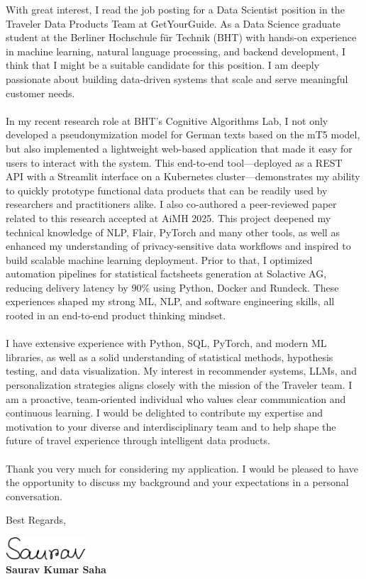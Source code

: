 \documentclass[10pt,a4paper,ragged2e,withhyper]{altacv}
\begin{document}
\begin{justify}

With great interest, I read the job posting for a Data Scientist position in 
the Traveler Data Products Team at GetYourGuide. As a Data Science graduate 
student at the Berliner Hochschule für Technik (BHT) with hands-on experience 
in machine learning, natural language processing, and backend development, I 
think that I might be a suitable candidate for this position. I am deeply 
passionate about building data-driven systems that scale and serve meaningful 
customer needs.
\\
\\
In my recent research role at BHT's Cognitive Algorithms Lab, I not only 
developed a pseudonymization model for German texts based on the mT5 model, 
but also implemented a lightweight web-based application that made it easy for 
users to interact with the system. This end-to-end tool—deployed as a REST API 
with a Streamlit interface on a Kubernetes cluster—demonstrates my ability to 
quickly prototype functional data products that can be readily used by 
researchers and practitioners alike. I also co-authored a peer-reviewed paper 
related to this research accepted at AiMH 2025.
This project deepened my technical knowledge of NLP, Flair, PyTorch and many 
other tools, as well as enhanced my understanding of privacy-sensitive data 
workflows and inspired to build scalable machine learning deployment.
Prior to that, I optimized automation pipelines for statistical factsheets 
generation at Solactive AG, reducing delivery latency by 90\% using Python, 
Docker and Rundeck.
These experiences shaped my strong ML, NLP, and software engineering skills, 
all rooted in an end-to-end product thinking mindset.
\\
\\
I have extensive experience with Python, SQL, PyTorch, and modern ML 
libraries, as well as a solid understanding of statistical methods, hypothesis 
testing, and data visualization. My interest in recommender systems, LLMs, and 
personalization strategies aligns closely with the mission of the Traveler 
team.
I am a proactive, team-oriented individual who values clear communication and 
continuous learning.
I would be delighted to contribute my expertise and motivation to your diverse 
and interdisciplinary team and to help shape the future of travel experience 
through intelligent data products.
\\
\\
Thank you very much for considering my application. I would be pleased to have 
the opportunity to discuss my background and your expectations in a personal 
conversation.

\end{justify}

\vspace{0.5cm}

Best Regards,\\

\vspace{0.5cm}

\includegraphics[width=3cm]{signature}\\[0.2cm]
\textbf{Saurav Kumar Saha}
\end{document}
